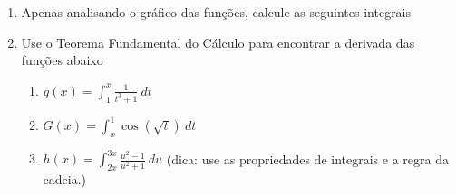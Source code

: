 \documentclass[a4paper,5pt]{amsbook}
\begin{document}
\begin{enumerate}
    \vspace{0.5cm}
    \item Apenas analisando o gr\'afico das fun\c{c}\~oes, calcule as seguintes integrais


    \vspace{0.5cm}
    \item Use o Teorema Fundamental do C\'alculo para encontrar a derivada das
    	fun\c{c}\~oes abaixo
    \begin{enumerate}
    	\item $\displaystyle g(x) = \int_1^x \frac{1}{t^3 + 1}\ dt$
    	\item $\displaystyle G(x) = \int_x^1 \cos(\sqrt{t})\ dt$
        \item $\displaystyle h(x) = \int_{2x}^{3x} \frac{u^2 - 1}{u^2 + 1}\ du$
            (dica: use as propriedades de integrais e a regra da cadeia.)
    \end{enumerate}
\end{enumerate}
\end{document}
